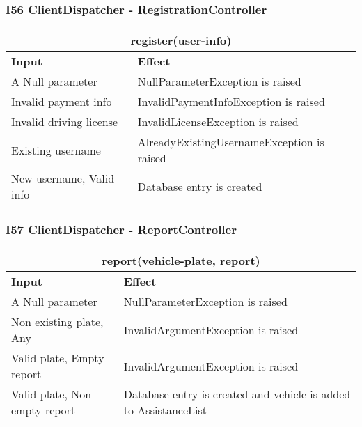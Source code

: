 \subsubsection{I56 ClientDispatcher - RegistrationController}
\begin{tabular}{|p{5cm}|p{7cm}|}
\hline
\multicolumn{2}{|c|}{register(user-info)} \\
\hline
\textbf{Input} & \textbf{Effect} \\

\hline
A Null parameter & NullParameterException is raised \\

\hline
Invalid payment info & InvalidPaymentInfoException is raised \\

\hline
Invalid driving license & InvalidLicenseException is raised \\

\hline
Existing username & AlreadyExistingUsernameException is raised \\

\hline
New username, Valid info & Database entry is created \\
\hline
\end{tabular}
\subsubsection{I57 ClientDispatcher - ReportController}

\begin{tabular}{|p{5cm}|p{7cm}|}
\hline
\multicolumn{2}{|c|}{report(vehicle-plate, report)} \\
\hline
\textbf{Input} & \textbf{Effect} \\

\hline
A Null parameter & NullParameterException is raised \\

\hline
Non existing plate, Any & InvalidArgumentException is raised \\

\hline
Valid plate, Empty report & InvalidArgumentException is raised \\

\hline
Valid plate, Non-empty report & Database entry is created and vehicle is added to AssistanceList\\
\hline
\end{tabular}
